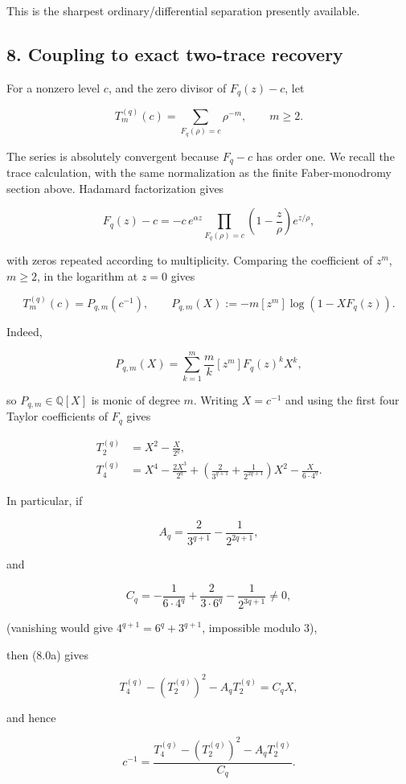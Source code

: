 This is the sharpest ordinary/differential separation presently available.

\subsection{8. Coupling to exact two-trace recovery}

For a nonzero level \(c\), and the zero divisor of \(F_q(z)-c\), let

\[
 T_m^{(q)}(c)=\sum_{F_q(\rho)=c}\rho^{-m},\qquad m\geq2.
\]

The series is absolutely convergent because \(F_q-c\) has order one. We
recall the trace calculation, with the same normalization as the finite
Faber-monodromy section above. Hadamard factorization gives

\[
 F_q(z)-c=-c\,e^{\alpha z}
 \prod_{F_q(\rho)=c}\left(1-\frac z\rho\right)e^{z/\rho},
\]

with zeros repeated according to multiplicity. Comparing the coefficient
of \(z^m\), \(m\geq2\), in the logarithm at \(z=0\) gives

\[
 T_m^{(q)}(c)=P_{q,m}(c^{-1}),\qquad
 P_{q,m}(X):=-m[z^m]\log(1-XF_q(z)).
\tag{Inv-8.0}
\]

Indeed,

\[
 P_{q,m}(X)=\sum_{k=1}^m\frac{m}{k}[z^m]F_q(z)^kX^k,
\]

so \(P_{q,m}\in\mathbb Q[X]\) is monic of degree \(m\). Writing
\(X=c^{-1}\) and using the first four Taylor coefficients of \(F_q\) gives

\[
 \begin{aligned}
 T_2^{(q)}&=X^2-\frac{X}{2^q},\\
 T_4^{(q)}&=X^4-\frac{2X^3}{2^q}
 +\left(\frac2{3^{q+1}}+\frac1{2^{2q+1}}\right)X^2
 -\frac{X}{6\cdot4^q}.
 \end{aligned}
\tag{Inv-8.0a}
\]

In particular, if

\[
 A_q=\frac2{3^{q+1}}-\frac1{2^{2q+1}},
\]

and

\[
 C_q=-\frac1{6\cdot4^q}+\frac2{3\cdot6^q}
     -\frac1{2^{3q+1}}\ne0,
\]

(vanishing would give \(4^{q+1}=6^q+3^{q+1}\), impossible modulo \(3\)),

then (8.0a) gives

\[
 T_4^{(q)}-(T_2^{(q)})^2-A_qT_2^{(q)}=C_qX,
\]

and hence

\[
 c^{-1}=\frac{T_4^{(q)}-(T_2^{(q)})^2-A_qT_2^{(q)}}{C_q}.
\tag{Inv-8.1}
\]

